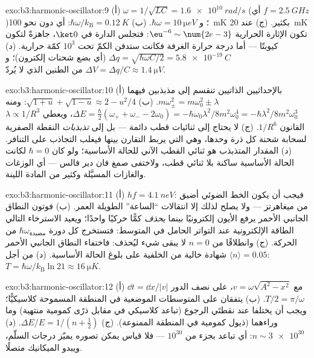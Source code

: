 \begin{solution}{exo:b3:harmonic-oscillator:9}
(أ) $\omega = 1/\sqrt{LC} = \qty{1.6e10}{rad/s}$ (أي $f =
\qty{2.5}{GHz}$)؛ و $\hbar\omega = \qty{10}{\micro eV}$. (ب)
$\hbar\omega/k_{\text{B}} = \qty{0.12}{K}$: أي دون نحو
\qty{100}{mK} بكثير. (ج) عند \qty{20}{mK} تكون الإثارة الحرارية
$\eu^{-6} \sim \num{2e-3}$: فتجلس الدارة في $\ket0$، جاهزةً
لتكون كيوبتًا --- أما درجة حرارة الغرفة فكانت ستدفن الكمّ تحت $10^3$
كمّة حرارية. (د) $\Delta q = \sqrt{\hbar\omega C/2} =
\qty{5.8e-19}{C}$ (أي بضع شحنات إلكترون)؛ و $\Delta V = \Delta q/C
\approx \qty{1.4}{\micro V}$ من الطنين الذي لا يُردّ.
\end{solution}

\begin{solution}{exo:b3:harmonic-oscillator:10}
(أ) بالإحداثيين الذاتيين تنقسم  إلى مذبذبين
فيهما $m\omega_\pm^2 = m\omega_0^2 \pm \lambda$. (ب)
$\sqrt{1 + u} + \sqrt{1 - u} \approx 2 - u^2/4$: ومنه $\Delta E =
\tfrac\hbar2(\omega_+ + \omega_- - 2\omega_0) =
-\hbar\omega_0\lambda^2/8m^2\omega_0^4 =
-\hbar\lambda^2/8m^2\omega_0^3$، ويعطي $\lambda \propto 1/R^3$
القانون $1/R^6$. (ج) لا يحتاج إلى ثنائيات قطب دائمة --- بل إلى
\emph{تذبذبات} النقطة الصفرية لسحابة شحنة كل ذرة وحدها، وهي التي
يربط التقارن بينها فيغلب التجاذب على التنافر. (د) المقدار
المتذبذب هو ثنائي القطب الآني للحالة الأساسية؛ ولو كان $\hbar = 0$
لكانت الحالة الأساسية ساكنة بلا ثنائي قطب، ولاختفى
صمغ فان دير فالس --- أي الوزغات والغازات المسيَّلة وكثير من
المادة اللينة.
\end{solution}

\begin{solution}{exo:b3:harmonic-oscillator:11}
(أ) $hf = \qty{4.1}{neV}$: فيجب أن يكون الخط الضوئي أضيق من
ميغاهرتز --- ولا يصلح لذلك إلا انتقالات ``الساعة'' الطويلة العمر. (ب)
فوتون النطاق الجانبي الأحمر يرفع الأيون إلكترونيًا بينما
\emph{يحذف} كمًّا حركيًا واحدًا؛ ويعيد الاسترخاء التالي الطاقة
الإلكترونية عند التواتر الحامل في المتوسط: فتستخرج كل
دورة $\hbar\omega_{\text{مصيدة}}$ من الحركة. (ج) وانطلاقًا من $n = 0$
لا يبقى شيء ليُحذف: فاختفاء النطاق الجانبي الأحمر
شهادة خالية من الخلفية على بلوغ الحالة الأساسية. (د)
من أجل $\langle n\rangle = 0.05$: $T = \hbar\omega/k_{\text{B}}\ln21
\approx \qty{16}{\micro K}$.
\end{solution}

\begin{solution}{exo:b3:harmonic-oscillator:12}
(أ) $\dd t = \dd x/|v|$ مع $v = \omega\sqrt{A^2 - x^2}$، على
نصف الدور $T/2 = \pi/\omega$. (ب) يتفقان على المتوسطات الموضعية في
المنطقة المسموحة كلاسيكيًّا؛ ويجب أن يختلفا عند نقطتَي
الرجوع (تباعد كلاسيكي في مقابل ذرًى كمومية منتهية) وما وراءهما
(ذيول كمومية في المنطقة الممنوعة). (ج) $\Delta E/E = 1/(n +
\tfrac12)$. (د) $n \sim \num{3e30}$: أي تباعد بجزء من $10^{30}$
--- فلا قياس يمكن تصوره يميّز درجات السلّم، ويبدو الميكانيك
متصلًا.
\end{solution}

